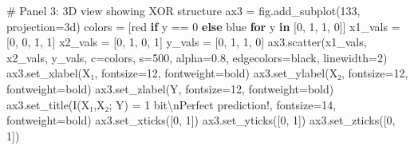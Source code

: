 \documentclass[
  11pt,
  letterpaper,
  oneside,
  openany]{book}
\newenvironment{Shaded}{\begin{snugshade}}{\end{snugshade}}
\newcommand{\CharTok}[1]{\textcolor[rgb]{0.13,0.47,0.30}{#1}}
\newcommand{\CommentTok}[1]{\textcolor[rgb]{0.37,0.37,0.37}{#1}}
\newcommand{\ControlFlowTok}[1]{\textcolor[rgb]{0.00,0.23,0.31}{\textbf{#1}}}
\newcommand{\DecValTok}[1]{\textcolor[rgb]{0.68,0.00,0.00}{#1}}
\newcommand{\FloatTok}[1]{\textcolor[rgb]{0.68,0.00,0.00}{#1}}
\newcommand{\KeywordTok}[1]{\textcolor[rgb]{0.00,0.23,0.31}{\textbf{#1}}}
\newcommand{\NormalTok}[1]{\textcolor[rgb]{0.00,0.23,0.31}{#1}}
\newcommand{\OperatorTok}[1]{\textcolor[rgb]{0.37,0.37,0.37}{#1}}
\newcommand{\StringTok}[1]{\textcolor[rgb]{0.13,0.47,0.30}{#1}}
\begin{document}
\begin{Shaded}
\begin{Highlighting}[]
\CommentTok{\# Panel 3: 3D view showing XOR structure}
\NormalTok{ax3 }\OperatorTok{=}\NormalTok{ fig.add\_subplot(}\DecValTok{133}\NormalTok{, projection}\OperatorTok{=}\StringTok{\textquotesingle{}3d\textquotesingle{}}\NormalTok{)}
\NormalTok{colors }\OperatorTok{=}\NormalTok{ [}\StringTok{\textquotesingle{}red\textquotesingle{}} \ControlFlowTok{if}\NormalTok{ y }\OperatorTok{==} \DecValTok{0} \ControlFlowTok{else} \StringTok{\textquotesingle{}blue\textquotesingle{}} \ControlFlowTok{for}\NormalTok{ y }\KeywordTok{in}\NormalTok{ [}\DecValTok{0}\NormalTok{, }\DecValTok{1}\NormalTok{, }\DecValTok{1}\NormalTok{, }\DecValTok{0}\NormalTok{]]}
\NormalTok{x1\_vals }\OperatorTok{=}\NormalTok{ [}\DecValTok{0}\NormalTok{, }\DecValTok{0}\NormalTok{, }\DecValTok{1}\NormalTok{, }\DecValTok{1}\NormalTok{]}
\NormalTok{x2\_vals }\OperatorTok{=}\NormalTok{ [}\DecValTok{0}\NormalTok{, }\DecValTok{1}\NormalTok{, }\DecValTok{0}\NormalTok{, }\DecValTok{1}\NormalTok{]}
\NormalTok{y\_vals }\OperatorTok{=}\NormalTok{ [}\DecValTok{0}\NormalTok{, }\DecValTok{1}\NormalTok{, }\DecValTok{1}\NormalTok{, }\DecValTok{0}\NormalTok{]}
\NormalTok{ax3.scatter(x1\_vals, x2\_vals, y\_vals, c}\OperatorTok{=}\NormalTok{colors, s}\OperatorTok{=}\DecValTok{500}\NormalTok{, alpha}\OperatorTok{=}\FloatTok{0.8}\NormalTok{, edgecolors}\OperatorTok{=}\StringTok{\textquotesingle{}black\textquotesingle{}}\NormalTok{, linewidth}\OperatorTok{=}\DecValTok{2}\NormalTok{)}
\NormalTok{ax3.set\_xlabel(}\StringTok{\textquotesingle{}X₁\textquotesingle{}}\NormalTok{, fontsize}\OperatorTok{=}\DecValTok{12}\NormalTok{, fontweight}\OperatorTok{=}\StringTok{\textquotesingle{}bold\textquotesingle{}}\NormalTok{)}
\NormalTok{ax3.set\_ylabel(}\StringTok{\textquotesingle{}X₂\textquotesingle{}}\NormalTok{, fontsize}\OperatorTok{=}\DecValTok{12}\NormalTok{, fontweight}\OperatorTok{=}\StringTok{\textquotesingle{}bold\textquotesingle{}}\NormalTok{)}
\NormalTok{ax3.set\_zlabel(}\StringTok{\textquotesingle{}Y\textquotesingle{}}\NormalTok{, fontsize}\OperatorTok{=}\DecValTok{12}\NormalTok{, fontweight}\OperatorTok{=}\StringTok{\textquotesingle{}bold\textquotesingle{}}\NormalTok{)}
\NormalTok{ax3.set\_title(}\StringTok{\textquotesingle{}I(X₁,X₂; Y) = 1 bit}\CharTok{\textbackslash{}n}\StringTok{Perfect prediction!\textquotesingle{}}\NormalTok{, fontsize}\OperatorTok{=}\DecValTok{14}\NormalTok{, fontweight}\OperatorTok{=}\StringTok{\textquotesingle{}bold\textquotesingle{}}\NormalTok{)}
\NormalTok{ax3.set\_xticks([}\DecValTok{0}\NormalTok{, }\DecValTok{1}\NormalTok{])}
\NormalTok{ax3.set\_yticks([}\DecValTok{0}\NormalTok{, }\DecValTok{1}\NormalTok{])}
\NormalTok{ax3.set\_zticks([}\DecValTok{0}\NormalTok{, }\DecValTok{1}\NormalTok{])}


\end{Highlighting}
\end{Shaded}
\end{document}
